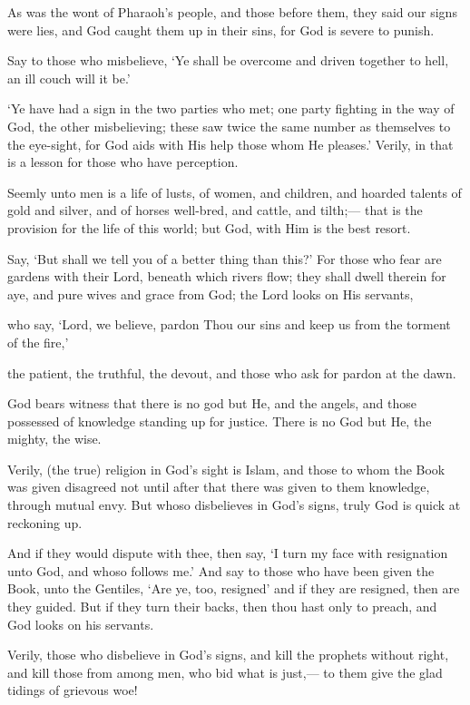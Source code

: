 \documentclass[fontsize=14pt, letterpaper, notitlepage, openany, DIV=12]{scrbook} %
\begin{document}
\noindent[3:11]
As was the wont of Pharaoh's people, and those before them, they said our signs were
lies, and God caught them up in their sins, for God is severe to punish.

\noindent[3:12]
Say to those who misbelieve, `Ye shall be overcome and driven together to hell, an ill
couch will it be.'

\noindent[3:13]
`Ye have had a sign in the two parties who met; one party fighting in the way of God, the
other misbelieving; these saw twice the same number as themselves to the eye-sight, for God
aids with His help those whom He pleases.' Verily, in that is a lesson for those who have
perception.

\noindent[3:14]
Seemly unto men is a life of lusts, of women, and children, and hoarded talents of gold
and silver, and of horses well-bred, and cattle, and tilth;--- that is the provision for the life of this
world; but God, with Him is the best resort.

\noindent[3:15]
Say, `But shall we tell you of a better thing than this?' For those who fear are gardens
with their Lord, beneath which rivers flow; they shall dwell therein for aye, and pure wives and
grace from God; the Lord looks on His servants,

\noindent[3:16]
who say, `Lord, we believe, pardon Thou our sins and keep us from the torment of the
fire,'

\noindent[3:17]
the patient, the truthful, the devout, and those who ask for pardon at the dawn.

\noindent[3:18]
God bears witness that there is no god but He, and the angels, and those possessed of
knowledge standing up for justice. There is no God but He, the mighty, the wise.

\noindent[3:19]
Verily, (the true) religion in God's sight is Islam, and those to whom the Book was given
disagreed not until after that there was given to them knowledge, through mutual envy. But
whoso disbelieves in God's signs, truly God is quick at reckoning up.

\noindent[3:20]
And if they would dispute with thee, then say, `I turn my face with resignation unto God,
and whoso follows me.' And say to those who have been given the Book, unto the Gentiles, `Are
ye, too, resigned' and if they are resigned, then are they guided. But if they turn their backs, then
thou hast only to preach, and God looks on his servants.

\noindent[3:21]
Verily, those who disbelieve in God's signs, and kill the prophets without right, and kill
those from among men, who bid what is just,--- to them give the glad tidings of grievous woe!
\end{document}
